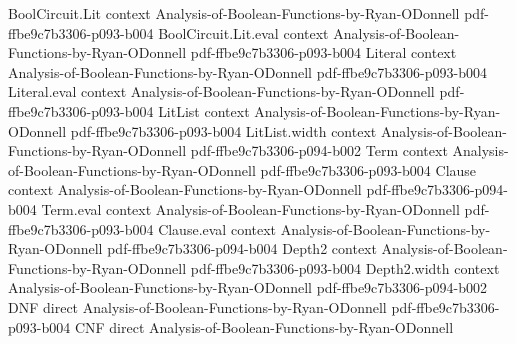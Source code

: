 \begin{lemma}
\leanok
{}
\proofstep
  {BoolCircuit.Lit}
  {context}
  {Analysis-of-Boolean-Functions-by-Ryan-ODonnell}
  {pdf-ffbe9c7b3306-p093-b004}
\proofstep
  {BoolCircuit.Lit.eval}
  {context}
  {Analysis-of-Boolean-Functions-by-Ryan-ODonnell}
  {pdf-ffbe9c7b3306-p093-b004}
\proofstep
  {Literal}
  {context}
  {Analysis-of-Boolean-Functions-by-Ryan-ODonnell}
  {pdf-ffbe9c7b3306-p093-b004}
\proofstep
  {Literal.eval}
  {context}
  {Analysis-of-Boolean-Functions-by-Ryan-ODonnell}
  {pdf-ffbe9c7b3306-p093-b004}
\proofstep
  {LitList}
  {context}
  {Analysis-of-Boolean-Functions-by-Ryan-ODonnell}
  {pdf-ffbe9c7b3306-p093-b004}
\proofstep
  {LitList.width}
  {context}
  {Analysis-of-Boolean-Functions-by-Ryan-ODonnell}
  {pdf-ffbe9c7b3306-p094-b002}
\proofstep
  {Term}
  {context}
  {Analysis-of-Boolean-Functions-by-Ryan-ODonnell}
  {pdf-ffbe9c7b3306-p093-b004}
\proofstep
  {Clause}
  {context}
  {Analysis-of-Boolean-Functions-by-Ryan-ODonnell}
  {pdf-ffbe9c7b3306-p094-b004}
\proofstep
  {Term.eval}
  {context}
  {Analysis-of-Boolean-Functions-by-Ryan-ODonnell}
  {pdf-ffbe9c7b3306-p093-b004}
\proofstep
  {Clause.eval}
  {context}
  {Analysis-of-Boolean-Functions-by-Ryan-ODonnell}
  {pdf-ffbe9c7b3306-p094-b004}
\proofstep
  {Depth2}
  {context}
  {Analysis-of-Boolean-Functions-by-Ryan-ODonnell}
  {pdf-ffbe9c7b3306-p093-b004}
\proofstep
  {Depth2.width}
  {context}
  {Analysis-of-Boolean-Functions-by-Ryan-ODonnell}
  {pdf-ffbe9c7b3306-p094-b002}
\proofstep
  {DNF}
  {direct}
  {Analysis-of-Boolean-Functions-by-Ryan-ODonnell}
  {pdf-ffbe9c7b3306-p093-b004}
\proofstep
  {CNF}
  {direct}
  {Analysis-of-Boolean-Functions-by-Ryan-ODonnell}

\end{lemma}
